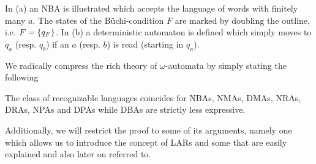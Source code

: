 \begin{drawing}
  \caption{In (a) an \ac{NBA} is illustrated which accepts the language of
  words with finitely many $a$. The states of the Büchi-condition $F$ are
  marked by doubling the outline, i.e. $F = \left\{q_{F}\right\}$.
  In (b) a deterministic automaton is defined which simply moves to $q_{a}$
  (resp. $q_{b}$) if an $a$ (resp. $b$) is read (starting in $q_{a}$).}
  \label{fig:finaautomata}
\end{drawing}
We radically compress the rich theory of $\omega$-automata by simply stating 
the following
\begin{theorem}
  \cite[Theorem 1.19, Theorem 1.24, Section 1.3.2,Theorem 3.2]{AutoLogInfGames}
  The class of recognizable languages coincides for \acp{NBA}, \acp{NMA},
  \acp{DMA}, \acp{NRA}, \acp{DRA}, \acp{NPA} and \acp{DPA} while \acp{DBA} are
  strictly less expressive.
\end{theorem}
Additionally, we will restrict the proof to some of its arguments, namely one
which allows us to introduce the concept of \acp{LAR} and some that are easily
explained and also later on referred to.
